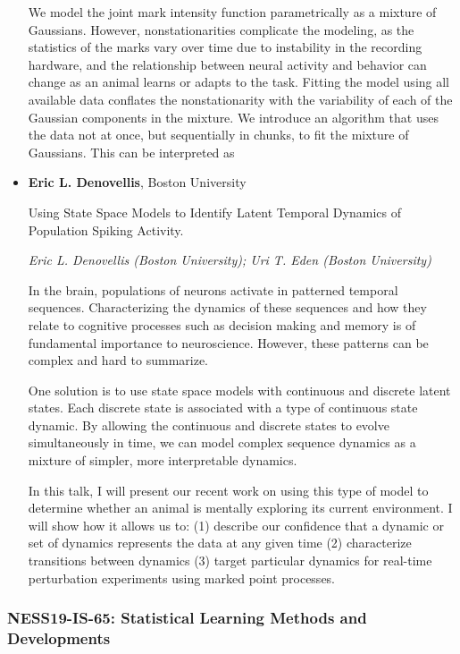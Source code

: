 \begin{itemize}
We model the joint mark intensity function parametrically as a mixture of Gaussians.  However, nonstationarities complicate the modeling, as the statistics of the marks vary over time due to instability in the recording hardware, and the relationship between neural activity and behavior can change as an animal learns or adapts to the task.  Fitting the model using all available data conflates the nonstationarity with the variability of each of the Gaussian components in the mixture.  We introduce an algorithm that uses the data not at once, but sequentially in chunks, to fit the mixture of Gaussians.   This can be interpreted as

\item \textbf{Eric L. Denovellis}, Boston University

Using State Space Models to Identify Latent Temporal Dynamics of Population Spiking Activity.

\emph{\footnotesize Eric L. Denovellis (Boston University); Uri T. Eden (Boston University)}

In the brain, populations of neurons activate in patterned temporal sequences. Characterizing the dynamics of these sequences and how they relate to cognitive processes such as decision making and memory is of fundamental importance to neuroscience. However, these patterns can be complex and hard to summarize.

One solution is to use state space models with continuous and discrete latent states. Each discrete state is associated with a type of continuous state dynamic. By allowing the continuous and discrete states to evolve simultaneously in time, we can model complex sequence dynamics as a mixture of simpler, more interpretable dynamics.

In this talk, I will present our recent work on using this type of model to determine whether an animal is mentally exploring its current environment. I will show how it allows us to: (1) describe our confidence that a dynamic or set of dynamics represents the data at any given time (2) characterize transitions between dynamics (3) target particular dynamics for real-time perturbation experiments using marked point processes.

\end{itemize}

\subsubsection*{NESS19-IS-65: Statistical Learning Methods and Developments}

